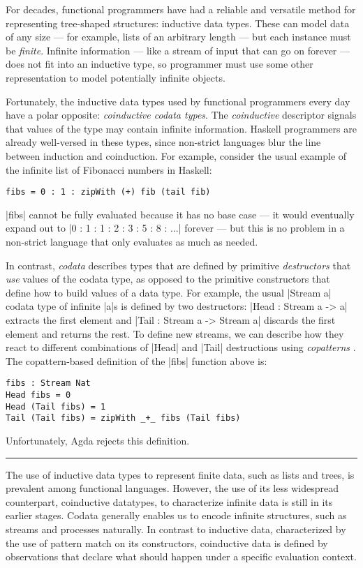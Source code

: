 For decades, functional programmers have had a reliable and versatile method for representing tree-shaped structures: inductive data types.
These can model data of any size --- for example, lists of an arbitrary length --- but each instance must be \emph{finite}.
Infinite information --- like a stream of input that can go on forever --- does not fit into an inductive type, so programmer must use some other representation to model potentially infinite objects.

Fortunately, the inductive data types used by functional programmers every day have a polar opposite: \emph{coinductive codata types}.
The \emph{coinductive} descriptor signals that values of the type may contain infinite information.
Haskell programmers are already well-versed in these types, since non-strict languages blur the line between induction and coinduction.
For example, consider the usual example of the infinite list of Fibonacci numbers in Haskell:
\begin{verbatim}
fibs = 0 : 1 : zipWith (+) fib (tail fib)
\end{verbatim}
\hs|fibs| cannot be fully evaluated because it has no base case --- it would eventually expand out to \hs|0 : 1 : 1 : 2 : 3 : 5 : 8 : ...| forever --- but this is no problem in a non-strict language that only evaluates as much as needed.

In contrast, \emph{codata} describes types that are defined by primitive \emph{destructors} that \emph{use} values of the codata type, as opposed to the primitive constructors that define how to build values of a data type.
For example, the usual \agda|Stream a| codata type of infinite \agda|a|s is defined by two destructors: \agda|Head : Stream a -> a| extracts the first element and \agda|Tail : Stream a -> Stream a| discards the first element and returns the rest.
To define new streams, we can describe how they react to different combinations of \agda|Head| and \agda|Tail| destructions using \emph{copatterns} \cite{APTS2013C}.  The copattern-based definition of the \agda|fibs| function above is:
\begin{verbatim}
fibs : Stream Nat
Head fibs = 0
Head (Tail fibs) = 1
Tail (Tail fibs) = zipWith _+_ fibs (Tail fibs)
\end{verbatim}
Unfortunately, Agda rejects this definition.

\vspace{2em}
\hrule
\vspace{2em}

The use of inductive data types to represent finite data, such as lists and trees, is prevalent among functional languages.
However, the use of its less widespread counterpart, coinductive datatypes, to characterize infinite data is still in its earlier stages.
Codata generally enables us to encode infinite structures, such as streams and processes naturally.
In contrast to inductive data, characterized by the use of pattern match on its constructors, coinductive data is defined by observations that declare what should happen under a specific evaluation context.

